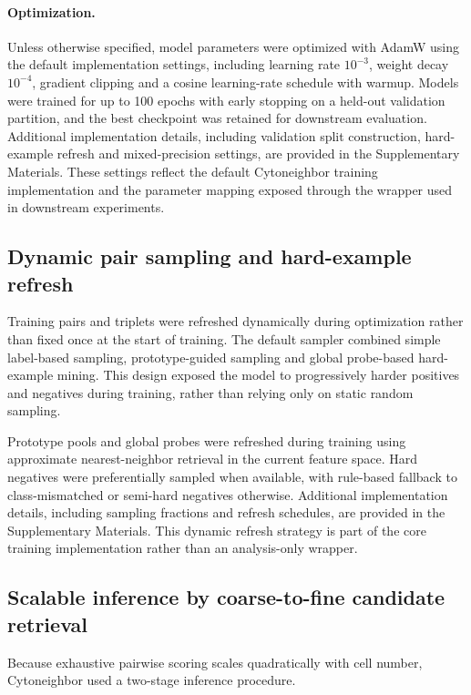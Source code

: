 \documentclass[11pt]{article}
\begin{document}
\paragraph{Optimization.}
Unless otherwise specified, model parameters were optimized with AdamW using the default implementation settings, including learning rate $10^{-3}$, weight decay $10^{-4}$, gradient clipping and a cosine learning-rate schedule with warmup. Models were trained for up to 100 epochs with early stopping on a held-out validation partition, and the best checkpoint was retained for downstream evaluation. Additional implementation details, including validation split construction, hard-example refresh and mixed-precision settings, are provided in the Supplementary Materials. These settings reflect the default Cytoneighbor training implementation and the parameter mapping exposed through the wrapper used in downstream experiments. 

\subsection{Dynamic pair sampling and hard-example refresh}

Training pairs and triplets were refreshed dynamically during optimization rather than fixed once at the start of training. The default sampler combined simple label-based sampling, prototype-guided sampling and global probe-based hard-example mining. This design exposed the model to progressively harder positives and negatives during training, rather than relying only on static random sampling.

Prototype pools and global probes were refreshed during training using approximate nearest-neighbor retrieval in the current feature space. Hard negatives were preferentially sampled when available, with rule-based fallback to class-mismatched or semi-hard negatives otherwise. Additional implementation details, including sampling fractions and refresh schedules, are provided in the Supplementary Materials. This dynamic refresh strategy is part of the core training implementation rather than an analysis-only wrapper.

\subsection{Scalable inference by coarse-to-fine candidate retrieval}

Because exhaustive pairwise scoring scales quadratically with cell number, Cytoneighbor used a two-stage inference procedure.
\end{document}
